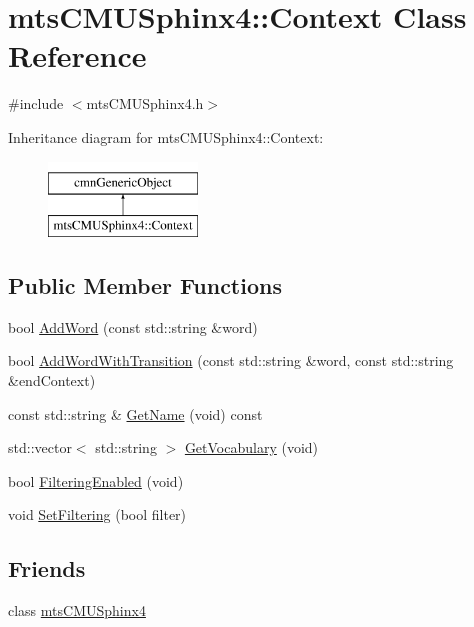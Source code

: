 \hypertarget{classmts_c_m_u_sphinx4_1_1_context}{}\section{mts\+C\+M\+U\+Sphinx4\+:\+:Context Class Reference}
\label{classmts_c_m_u_sphinx4_1_1_context}


{\ttfamily \#include $<$mts\+C\+M\+U\+Sphinx4.\+h$>$}

Inheritance diagram for mts\+C\+M\+U\+Sphinx4\+:\+:Context\+:\begin{figure}[H]
\begin{center}
\leavevmode
\includegraphics[height=2.000000cm]{d2/dde/classmts_c_m_u_sphinx4_1_1_context}
\end{center}
\end{figure}
\subsection*{Public Member Functions}
\begin{DoxyCompactItemize}
\item 
bool \hyperlink{classmts_c_m_u_sphinx4_1_1_context_aec1afbfd439d7578ff6ead7153aaf3c1}{Add\+Word} (const std\+::string \&word)
\item 
bool \hyperlink{classmts_c_m_u_sphinx4_1_1_context_aa8289ca9ebc0f2b4f307fd2ba0d46af4}{Add\+Word\+With\+Transition} (const std\+::string \&word, const std\+::string \&end\+Context)
\item 
const std\+::string \& \hyperlink{classmts_c_m_u_sphinx4_1_1_context_aa1620177d66a6075614b95df09065faa}{Get\+Name} (void) const 
\item 
std\+::vector$<$ std\+::string $>$ \hyperlink{classmts_c_m_u_sphinx4_1_1_context_a0e2994ee8da0a2573ec44c84da31fa29}{Get\+Vocabulary} (void)
\item 
bool \hyperlink{classmts_c_m_u_sphinx4_1_1_context_aa9e05b62607f0cd23d698fc2b8bd09c6}{Filtering\+Enabled} (void)
\item 
void \hyperlink{classmts_c_m_u_sphinx4_1_1_context_aa32231ba771069dfb3a8eb4147d3f039}{Set\+Filtering} (bool filter)
\end{DoxyCompactItemize}
\subsection*{Friends}
\begin{DoxyCompactItemize}
\item 
class \hyperlink{classmts_c_m_u_sphinx4_1_1_context_a9fe1241bdee240deba664bfbaadf5301}{mts\+C\+M\+U\+Sphinx4}
\end{DoxyCompactItemize}


